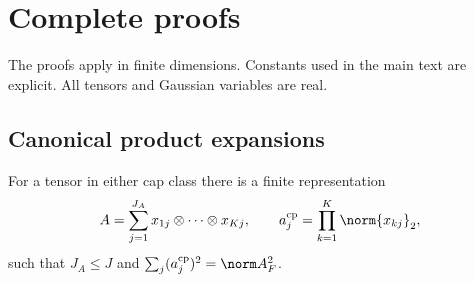 \section{Complete proofs}\label{app:proofs}

The proofs apply in finite dimensions. Constants used in the main text are explicit. All tensors and Gaussian variables are real.

\subsection{Canonical product expansions}

\begin{lemma}\label{lem:cp}
For a tensor in either cap class there is a finite representation
\[
 A=\sum_{j=1}^{J_A}x_{1j}\otimes\cdots\otimes x_{Kj},\qquad
 a_j^{\mathrm{cp}}=\prod_{k=1}^K\norm{x_{kj}}_2,
\]
such that $J_A\le J$ and $\sum_j(a_j^{\mathrm{cp}})^2=\norm A_F^2$.
\end{lemma}

